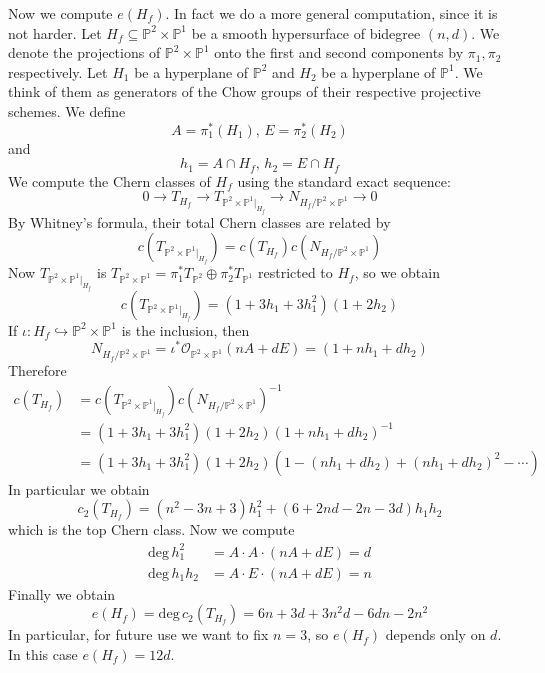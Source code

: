 \documentclass[12pt]{article}
\theoremstyle{plain}
\theoremstyle{definition}
\newcommand{\IP}{\mathbb{P}}
\newcommand{\sO}{\mathcal{O}}
\renewcommand{\deg}{\mathrm{deg}\,}
\newcommand{\<}{\langle}
\renewcommand{\>}{\rangle}
\newcommand{\into}{\hookrightarrow}
\begin{document}
Now we compute $e(H_f)$. In fact we do a more general computation, since it is not harder. Let $H_f \subseteq \IP^2 \times \IP^1$ be a smooth hypersurface of bidegree $(n, d)$. We denote the projections of $\IP^2 \times \IP^1$ onto the first and second components by $\pi_1, \pi_2$ respectively. Let $H_1$ be a hyperplane of $\IP^2$ and $H_2$ be a hyperplane of $\IP^1$. We think of them as generators of the Chow groups of their respective projective schemes. We define 
$$ A = \pi_1^*(H_1), \, E = \pi_2^*(H_2) $$
and $$ h_1 = A \cap H_f, \, h_2 = E \cap H_f $$
We compute the Chern classes of $H_f$ using the standard exact sequence:
$$ 0 \to T_{H_f} \to T_{\IP^2 \times \IP^1|_{H_f}} \to N_{H_f/\IP^2 \times \IP^1} \to 0$$
By Whitney\rq{}s formula, their total Chern classes are related by
$$ c(T_{\IP^2 \times \IP^1|_{H_f}}) = c(T_{H_f}) c(N_{H_f/\IP^2 \times \IP^1}) $$
Now $T_{\IP^2 \times \IP^1|_{H_f}}$ is $T_{\IP^2 \times \IP^1} = \pi_1^* T_{\IP^2} \oplus \pi_2^* T_{\IP^1}$ restricted to $H_f$, so we obtain 
$$ c(T_{\IP^2 \times \IP^1|_{H_f}}) = (1 + 3h_1 + 3h_1^2)(1 + 2h_2) $$
If $\iota : H_f \into \IP^2 \times \IP^1$ is the inclusion, then $$N_{H_f/\IP^2 \times \IP^1} = \iota^* \sO_{\IP^2 \times \IP^1}(nA  + dE) = (1 + nh_1 + dh_2)$$
Therefore 
\begin{align*}
c(T_{H_f}) &= c(T_{\IP^2 \times \IP^1|_{H_f}})c(N_{H_f/\IP^2 \times \IP^1})^{-1}\\
&= (1 + 3h_1 + 3h_1^2)(1 + 2h_2)(1 + nh_1 + dh_2)^{-1}\\
&= (1 + 3h_1 + 3h_1^2)(1 + 2h_2)(1 - (nh_1 + dh_2) + (nh_1 + dh_2)^2 - \cdots)
\end{align*}
In particular we obtain 
$$ c_2(T_{H_f}) = (n^2 - 3n + 3)h_1^2 + (6 + 2nd - 2n - 3d)h_1 h_2 $$
which is the top Chern class. Now we compute 
\begin{align*}
\deg h_1^2 &= A \cdot A \cdot (nA + dE) = d \\
\deg h_1 h_2 &= A \cdot E \cdot (nA + dE) = n 
\end{align*}
Finally we obtain 
$$ e(H_f) = \deg c_2(T_{H_f}) = 6n + 3d + 3n^2 d - 6 dn - 2n^2 $$
In particular, for future use we want to fix $n = 3$, so $e(H_f)$ depends only on $d$. In this case $e(H_f) = 12 d$.  
\end{document}
